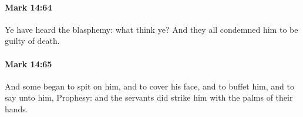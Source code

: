 		\paragraph{Mark 14:64} %
			\label{MARK-14-64}

			Ye have heard the blasphemy: what think ye? And they all condemned him to be guilty of death.

			\begin{framed}
			\scriptsize
				\begin{compactdesc}
					\item[SBLG] 
				\end{compactdesc}
			\end{framed}

		\paragraph{Mark 14:65} %
			\label{MARK-14-65}

			And some began to spit on him, and to cover his face, and to buffet him, and to say unto him, Prophesy: and the servants did strike him with the palms of their hands.

